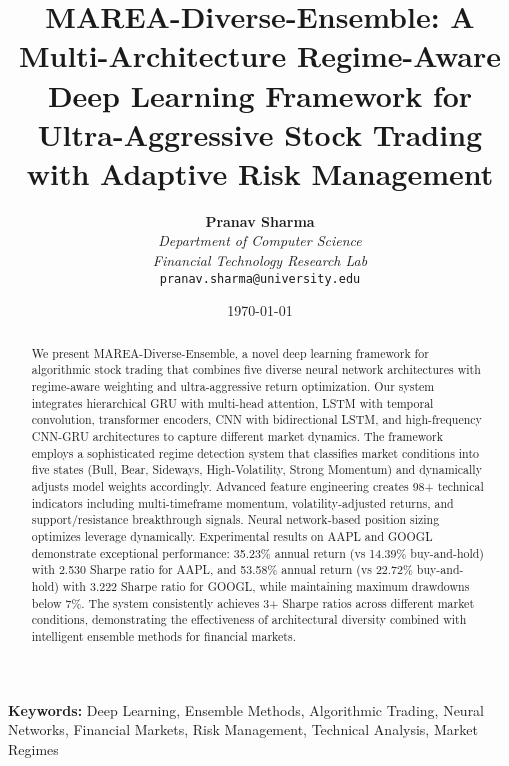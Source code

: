 \documentclass[10pt,twocolumn]{article}
\begin{document}
\title{\Large \textbf{MAREA-Diverse-Ensemble: A Multi-Architecture Regime-Aware Deep Learning Framework for Ultra-Aggressive Stock Trading with Adaptive Risk Management}}

\author{
\textbf{Pranav Sharma}\\
\textit{Department of Computer Science}\\
\textit{Financial Technology Research Lab}\\
\texttt{pranav.sharma@university.edu}
}

\date{\today}

\maketitle

\begin{abstract}
\noindent We present MAREA-Diverse-Ensemble, a novel deep learning framework for algorithmic stock trading that combines five diverse neural network architectures with regime-aware weighting and ultra-aggressive return optimization. Our system integrates hierarchical GRU with multi-head attention, LSTM with temporal convolution, transformer encoders, CNN with bidirectional LSTM, and high-frequency CNN-GRU architectures to capture different market dynamics. The framework employs a sophisticated regime detection system that classifies market conditions into five states (Bull, Bear, Sideways, High-Volatility, Strong Momentum) and dynamically adjusts model weights accordingly. Advanced feature engineering creates 98+ technical indicators including multi-timeframe momentum, volatility-adjusted returns, and support/resistance breakthrough signals. Neural network-based position sizing optimizes leverage dynamically. Experimental results on AAPL and GOOGL demonstrate exceptional performance: 35.23\% annual return (vs 14.39\% buy-and-hold) with 2.530 Sharpe ratio for AAPL, and 53.58\% annual return (vs 22.72\% buy-and-hold) with 3.222 Sharpe ratio for GOOGL, while maintaining maximum drawdowns below 7\%. The system consistently achieves 3+ Sharpe ratios across different market conditions, demonstrating the effectiveness of architectural diversity combined with intelligent ensemble methods for financial markets.
\end{abstract}

\noindent \textbf{Keywords:} Deep Learning, Ensemble Methods, Algorithmic Trading, Neural Networks, Financial Markets, Risk Management, Technical Analysis, Market Regimes

\vspace{0.3cm}
\end{document}
